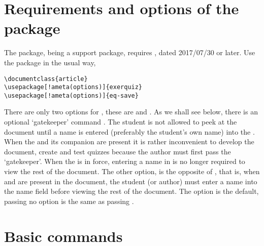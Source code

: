 \documentclass{article}
\begin{document}
\section{Requirements and options of the package}

The  package, being a support package, requires ,
dated 2017/07/30 or later. Use the package in the usual way,
\begin{Verbatim}[xleftmargin=\amtIndent,commandchars=!()]
\documentclass{article}
\usepackage[!ameta(options)]{exerquiz}
\usepackage[!ameta(options)]{eq-save}
\end{Verbatim}
There are only two options for , these are  and
. As we shall see
below, there is an optional `gatekeeper' command . The student
is not allowed to peek at the document until a name is entered (preferably
the student's own name) into the . When the  and
its companion  are present it is rather inconvenient to
develop the document, create and test quizzes because the author must first
pass the `gatekeeper'. When the  is in force, entering a name in
 is no longer required to view the rest of the document. The
other option,  is the opposite of , that is, when
 and  are present in the document, the
student (or author) must enter a name into the name field before viewing the
rest of the document. The  option is the default, passing no
option is the same as passing .

\section{Basic commands}
\end{document}
